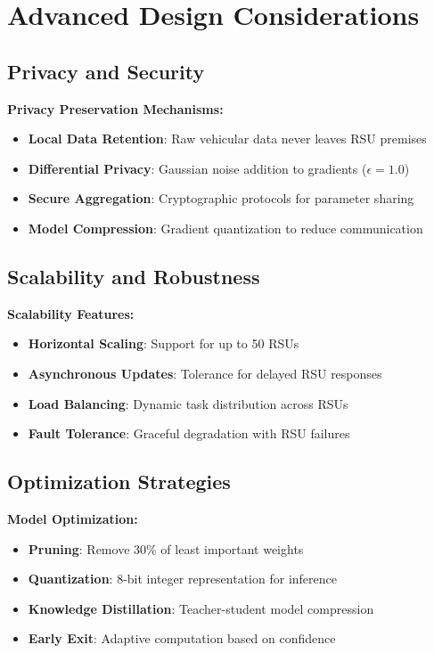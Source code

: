 \documentclass[11pt]{article}
\begin{document}
\section{Advanced Design Considerations}

\subsection{Privacy and Security}

\textbf{Privacy Preservation Mechanisms:}
\begin{itemize}
    \item \textbf{Local Data Retention}: Raw vehicular data never leaves RSU premises
    \item \textbf{Differential Privacy}: Gaussian noise addition to gradients ($\epsilon = 1.0$)
    \item \textbf{Secure Aggregation}: Cryptographic protocols for parameter sharing
    \item \textbf{Model Compression}: Gradient quantization to reduce communication
\end{itemize}

\subsection{Scalability and Robustness}

\textbf{Scalability Features:}
\begin{itemize}
    \item \textbf{Horizontal Scaling}: Support for up to 50 RSUs
    \item \textbf{Asynchronous Updates}: Tolerance for delayed RSU responses
    \item \textbf{Load Balancing}: Dynamic task distribution across RSUs
    \item \textbf{Fault Tolerance}: Graceful degradation with RSU failures
\end{itemize}

\subsection{Optimization Strategies}

\textbf{Model Optimization:}
\begin{itemize}
    \item \textbf{Pruning}: Remove 30\% of least important weights
    \item \textbf{Quantization}: 8-bit integer representation for inference
    \item \textbf{Knowledge Distillation}: Teacher-student model compression
    \item \textbf{Early Exit}: Adaptive computation based on confidence
\end{itemize}
\end{document}
